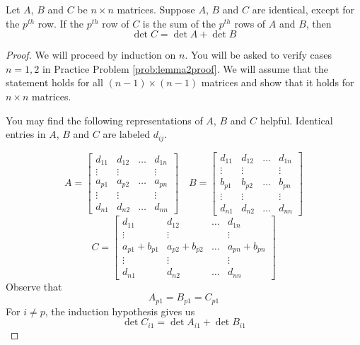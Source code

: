 \documentclass{ximera}
\begin{document}
\begin{lemma}\label{lemma:arowsumofbc}
Let $A$, $B$ and $C$ be $n\times n$ matrices. Suppose $A$, $B$ and $C$ are identical, except for the $p^{th}$ row.  If the $p^{th}$ row of $C$ is the sum of the $p^{th}$ rows of $A$ and $B$, then
$$\det{C}=\det{A}+\det{B}$$
\end{lemma}
\begin{proof}
We will proceed by induction on $n$.  You will be asked to verify cases $n=1, 2$ in Practice Problem \ref{prob:lemma2proof}.  We will assume that the statement holds for all $(n-1)\times (n-1)$ matrices and show that it holds for $n\times n$ matrices.

You may find the following representations of $A$, $B$ and $C$ helpful.  Identical entries in $A$, $B$ and $C$ are labeled $d_{ij}$.

$$A=\begin{bmatrix} d_{11} & d_{12} & \dots  & d_{1n}  \\
   \vdots & \vdots &  & \vdots \\
   a_{p1} & a_{p2} &\dots  & a_{pn}  \\
   \vdots & \vdots &  & \vdots  \\
   d_{n1} & d_{n2} & \dots  & d_{nn}\end{bmatrix}\quad
   B=\begin{bmatrix} d_{11} & d_{12} & \dots  & d_{1n}  \\
   \vdots & \vdots &  & \vdots \\
   b_{p1} & b_{p2} &\dots  & b_{pn}  \\
   \vdots & \vdots &  & \vdots  \\
   d_{n1} & d_{n2} & \dots  & d_{nn}\end{bmatrix}$$
   $$C=\begin{bmatrix} d_{11} & d_{12} & \dots  & d_{1n}  \\
   \vdots & \vdots &  & \vdots \\
   a_{p1}+b_{p1} & a_{p2}+b_{p2} &\dots  & a_{pn}+b_{pn}  \\
   \vdots & \vdots &  & \vdots  \\
   d_{n1} & d_{n2} & \dots  & d_{nn}\end{bmatrix}$$
Observe that $$A_{p1}=B_{p1}=C_{p1}$$  For $i\neq p$, the induction hypothesis gives us
$$\det{C_{i1}}=\det{A_{i1}}+\det{B_{i1}}$$
   

\end{proof}
\end{document}
